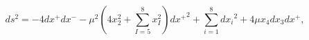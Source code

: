 \begin{equation}
ds^2 = - 4 dx^+ dx^- -\mu^2 \left(4 x_2^2 + \sum_{I=5}^8 x_I^2 \right) {dx^+}^2 +
 \sum_{i=1}^8 {dx_i}^2 + 4 \mu x_4 dx_3 dx^+,
\end{equation}

